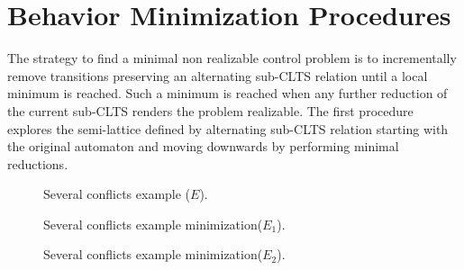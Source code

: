 
\section{Behavior Minimization Procedures}\label{sect:solution}

The strategy to find a minimal non realizable control problem is to incrementally remove transitions preserving an alternating sub-CLTS relation until a local minimum is reached.  Such a minimum is reached when any further reduction of the current sub-CLTS renders the problem realizable.
The first procedure explores the semi-lattice defined by alternating sub-CLTS relation starting with the original automaton and moving downwards by performing minimal reductions. 

\begin{figure}[bt]
	\centering
	\SmallPicture
	\caption{Several conflicts example ($E$).}
	\label{fig:fig.several-conflicts}
	\MediumPicture
\end{figure}

\begin{figure}[bt]
	\centering
	\SmallPicture
	\caption{Several conflicts example minimization($E_1$).}
	\label{fig:fig.several-conflicts-min1}
	\MediumPicture
\end{figure}

\begin{figure}[bt]
	\centering
	\SmallPicture
	\caption{Several conflicts example minimization($E_2$).}
	\label{fig:fig.several-conflicts-min2}
	\MediumPicture
\end{figure}

